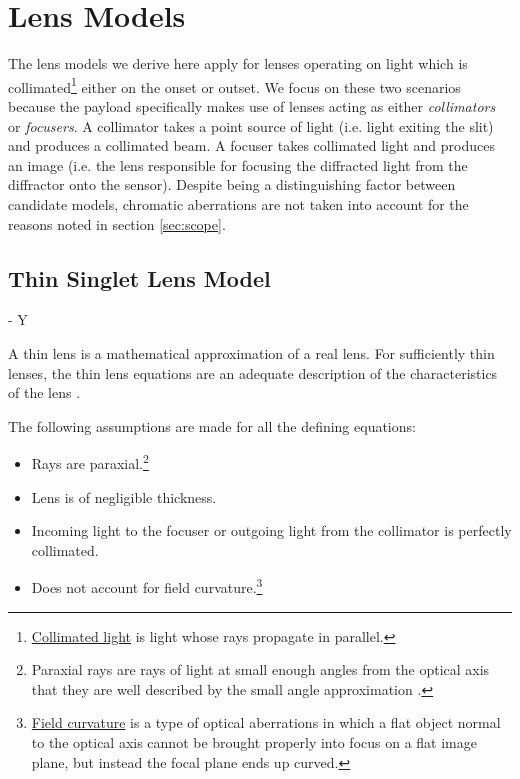 \section{Lens Models}
The lens models we derive here apply for lenses operating on light which is collimated\footnote{\href{https://en.wikipedia.org/wiki/Collimated_beam}{Collimated light} is light whose rays propagate in parallel.} either on the onset or outset. We focus on these two scenarios because the payload specifically makes use of lenses acting as either \textit{collimators} or \textit{focusers}. A collimator takes a point source of light (i.e. light exiting the slit) and produces a collimated beam. A focuser takes collimated light and produces an image (i.e. the lens responsible for focusing the diffracted light from the diffractor onto the sensor). Despite being a distinguishing factor between candidate models, chromatic aberrations are not taken into account for the reasons noted in section \ref{sec:scope}.


\subsection{Thin Singlet Lens Model} - Y \label{sec:thin-singlet-model}

A thin lens is a mathematical approximation of a real lens. For sufficiently thin lenses, the thin lens equations are an adequate description of the characteristics of the lens \cite{Boundless_undated-to}.

The following assumptions are made for all the defining equations:

\begin{itemize}
    \item Rays are paraxial.\footnote{Paraxial rays are rays of light at small enough angles from the optical axis that they are well described by the small angle approximation \cite{noauthor_undated-wt}.} 
    
    \item Lens is of negligible thickness.
    
    \item Incoming light to the focuser or outgoing light from the collimator is perfectly collimated.
    
    \item Does not account for field curvature.\footnote{\href{https://en.wikipedia.org/wiki/Petzval_field_curvature}{Field curvature} is a type of optical aberrations in which a flat object normal to the optical axis cannot be brought properly into focus on a flat image plane, but instead the focal plane ends up curved.}
\end{itemize}


